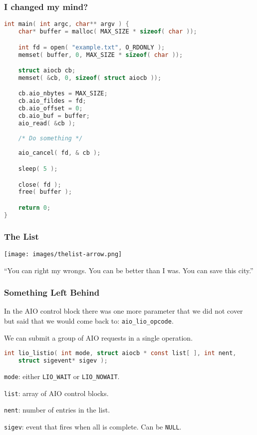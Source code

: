 \begin{frame}[fragile]
	\frametitle{I changed my mind?}

	\begin{lstlisting}[language=C]
int main( int argc, char** argv ) {
    char* buffer = malloc( MAX_SIZE * sizeof( char ));

    int fd = open( "example.txt", O_RDONLY );
    memset( buffer, 0, MAX_SIZE * sizeof( char ));

    struct aiocb cb;
    memset( &cb, 0, sizeof( struct aiocb ));

    cb.aio_nbytes = MAX_SIZE;
    cb.aio_fildes = fd;
    cb.aio_offset = 0;
    cb.aio_buf = buffer;
    aio_read( &cb );
    
    /* Do something */
    
    aio_cancel( fd, & cb );

    sleep( 5 );

    close( fd );
    free( buffer );

    return 0;
}
\end{lstlisting}

\end{frame}


\begin{frame}
	\frametitle{The List}

	\begin{center}
		\texttt{[image: images/thelist-arrow.png]}
	\end{center}

	``You can right my wrongs. You can be better than I was. You can save this city.''
\end{frame}


\begin{frame}[fragile]
	\frametitle{Something Left Behind }

	In the AIO control block there was one more parameter that we did not cover but said that we would come back to: \texttt{aio\_lio\_opcode}.

	We can submit a group of AIO requests in a single operation.

	\begin{lstlisting}[language=C]
int lio_listio( int mode, struct aiocb * const list[ ], int nent, 
    struct sigevent* sigev );
\end{lstlisting}

	\texttt{mode}: either \texttt{LIO\_WAIT} or \texttt{LIO\_NOWAIT}.

	\texttt{list}: array of AIO control blocks.

	\texttt{nent}: number of entries in the list.

	\texttt{sigev}: event that fires when all is complete. Can be \texttt{NULL}.

\end{frame}


